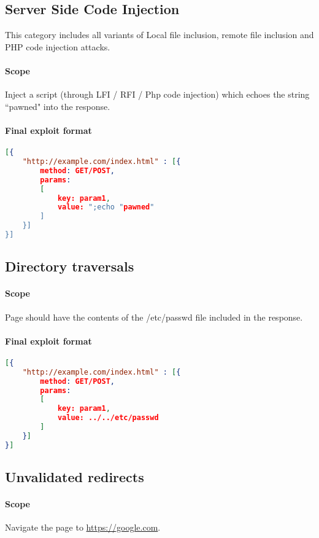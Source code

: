 \documentclass{article}[10pt]
\begin{document}
\subsection{Server Side Code Injection}
This category includes all variants of Local file inclusion, remote file inclusion and PHP code injection attacks.

\paragraph{Scope}
Inject a script (through LFI / RFI / Php code injection) which echoes the string ``pawned" into the response.

\paragraph{Final exploit format\\}

\begin{lstlisting}[language=json,firstnumber=1]
[{
	"http://example.com/index.html" : [{
		method: GET/POST,
		params: 
		[
			key: param1,
			value: ";echo "pawned"
		]
	}]
}]
\end{lstlisting}

\subsection{Directory traversals}
\paragraph{Scope}
Page should have the contents of the /etc/passwd file included in the response.

\paragraph{Final exploit format\\}
\begin{lstlisting}[language=json,firstnumber=1]
[{
	"http://example.com/index.html" : [{
		method: GET/POST,
		params: 
		[
			key: param1,
			value: ../../etc/passwd
		]
	}]
}]
\end{lstlisting}

\subsection{Unvalidated redirects}
\paragraph{Scope}
Navigate the page to \href{https://google.com}{https://google.com}.
\end{document}
